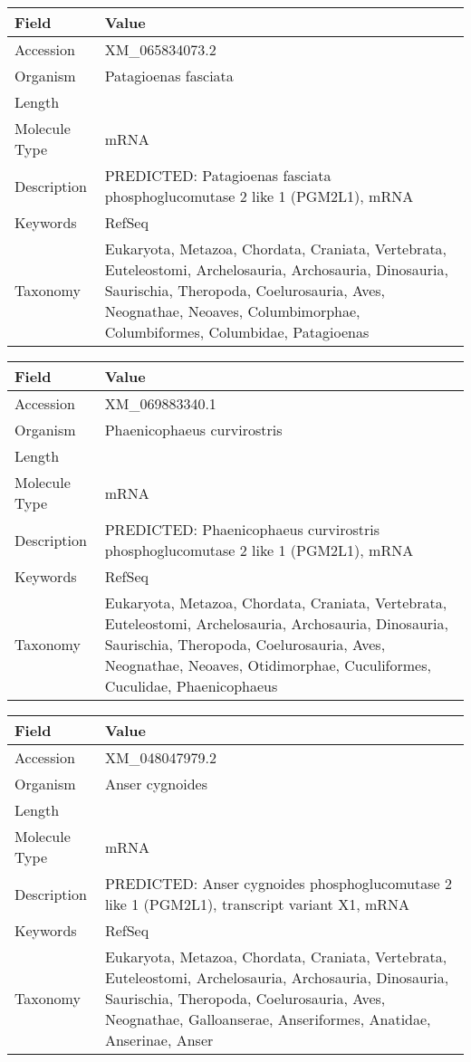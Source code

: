 \documentclass[10pt]{article}
\begin{document}
{\footnotesize
\begin{longtable}{>{\raggedright\arraybackslash}p{4.5cm} >{\raggedright\arraybackslash}p{11.5cm}}
\textbf{Field} & \textbf{Value} \\
\hline
Accession & XM\_065834073.2 \\
Organism & Patagioenas fasciata \\
Length & 5735 \\
Molecule Type & mRNA \\
Description & PREDICTED: Patagioenas fasciata phosphoglucomutase 2 like 1 (PGM2L1), mRNA \\
Keywords & RefSeq \\
Taxonomy & Eukaryota, Metazoa, Chordata, Craniata, Vertebrata, Euteleostomi, Archelosauria, Archosauria, Dinosauria, Saurischia, Theropoda, Coelurosauria, Aves, Neognathae, Neoaves, Columbimorphae, Columbiformes, Columbidae, Patagioenas \\
\end{longtable}
}

{\footnotesize
\begin{longtable}{>{\raggedright\arraybackslash}p{4.5cm} >{\raggedright\arraybackslash}p{11.5cm}}
\textbf{Field} & \textbf{Value} \\
\hline
Accession & XM\_069883340.1 \\
Organism & Phaenicophaeus curvirostris \\
Length & 4706 \\
Molecule Type & mRNA \\
Description & PREDICTED: Phaenicophaeus curvirostris phosphoglucomutase 2 like 1 (PGM2L1), mRNA \\
Keywords & RefSeq \\
Taxonomy & Eukaryota, Metazoa, Chordata, Craniata, Vertebrata, Euteleostomi, Archelosauria, Archosauria, Dinosauria, Saurischia, Theropoda, Coelurosauria, Aves, Neognathae, Neoaves, Otidimorphae, Cuculiformes, Cuculidae, Phaenicophaeus \\
\end{longtable}
}

{\footnotesize
\begin{longtable}{>{\raggedright\arraybackslash}p{4.5cm} >{\raggedright\arraybackslash}p{11.5cm}}
\textbf{Field} & \textbf{Value} \\
\hline
Accession & XM\_048047979.2 \\
Organism & Anser cygnoides \\
Length & 6462 \\
Molecule Type & mRNA \\
Description & PREDICTED: Anser cygnoides phosphoglucomutase 2 like 1 (PGM2L1), transcript variant X1, mRNA \\
Keywords & RefSeq \\
Taxonomy & Eukaryota, Metazoa, Chordata, Craniata, Vertebrata, Euteleostomi, Archelosauria, Archosauria, Dinosauria, Saurischia, Theropoda, Coelurosauria, Aves, Neognathae, Galloanserae, Anseriformes, Anatidae, Anserinae, Anser \\
\end{longtable}
}
\end{document}
